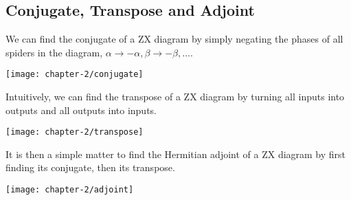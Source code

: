 \subsection{Conjugate, Transpose and Adjoint}

We can find the conjugate of a ZX diagram by simply negating the phases of all spiders in the diagram, $\alpha \rightarrow -\alpha, \beta \rightarrow -\beta, \dots$.

\begin{center}
    \texttt{[image: chapter-2/conjugate]}
\end{center}

Intuitively, we can find the transpose of a ZX diagram by turning all inputs into outputs and all outputs into inputs.

\begin{center}
    \texttt{[image: chapter-2/transpose]}
\end{center}

It is then a simple matter to find the Hermitian adjoint of a ZX diagram by first finding its conjugate, then its transpose.

\begin{center}
    \texttt{[image: chapter-2/adjoint]}
\end{center}

